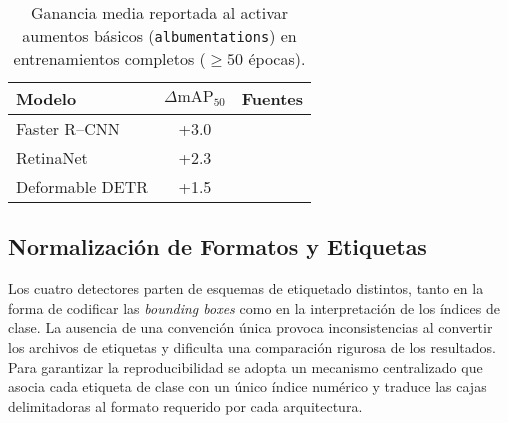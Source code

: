 \begin{table}[htpb]
    \centering
    \caption{Ganancia media reportada al activar aumentos básicos (\texttt{albumentations}) en entrenamientos completos ($\ge 50$ épocas).}
    \label{tab:aug_lit}
    \begin{tabular}{|l|c|l|}
        \hline
        \textbf{Modelo} & \(\Delta\text{mAP}_{50}\) & \textbf{Fuentes} \\ \hline
        Faster R--CNN    & +3.0 &~\cite{mdpi2020vehicles,mathworksRCNN} \\ \hline
        RetinaNet        & +2.3 &~\cite{cubuk2020autoaug,retinanetCOCO} \\ \hline
        Deformable DETR  & +1.5 &~\cite{rtdetr2024cvpr,smallobjDETR} \\ \hline
    \end{tabular}
\end{table}


\subsection{Normalización de Formatos y Etiquetas}\label{ssec:label_norm}

Los cuatro detectores parten de esquemas de etiquetado distintos, tanto en la forma de codificar las \emph{bounding boxes} como en la interpretación de los índices de clase.
La ausencia de una convención única provoca inconsistencias al convertir los archivos de etiquetas y dificulta una comparación rigurosa de los resultados.
Para garantizar la reproducibilidad se adopta un mecanismo centralizado que asocia cada etiqueta de clase con un único índice numérico y traduce las cajas delimitadoras al formato requerido por cada arquitectura.

